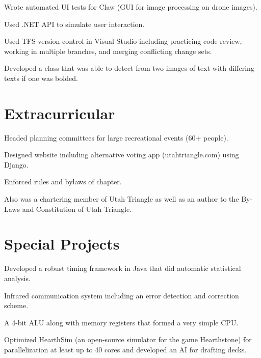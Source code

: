 \documentclass[letterpaper]{deedy-resume} %
\begin{document}
\begin{minipage}[t]{0.64\textwidth}
\begin{tightitemize}
\item Wrote automated UI tests for Claw (GUI for image processing on drone images).
\item Used .NET API to simulate user interaction.
\item Used TFS version control in Visual Studio including practicing code review, working in multiple branches, and merging conflicting change sets.
\item Developed a class that was able to detect from two images of text with differing texts if one was bolded.
\end{tightitemize}

\sectionspace %


\section{Extracurricular}

\begin{tightitemize}
\item Headed planning committees for large recreational events (60+ people).
\item Designed website including alternative voting app (utahtriangle.com) using Django.
\item Enforced rules and bylaws of chapter.
\item Also was a chartering member of Utah Triangle as well as an author to the By-Laws and Constitution of Utah Triangle.
\end{tightitemize}

\sectionspace %


\section{Special Projects} 
\begin{tightitemize}
\item Developed a robust timing framework in Java that did automatic statistical analysis.
\item Infrared communication system including an error detection and correction scheme.
\item A 4-bit ALU along with memory registers that formed a very simple CPU.
\item Optimized HearthSim (an open-source simulator for the game Hearthstone) for parallelization at least up to 40 cores and developed an AI for drafting decks.
\end{tightitemize}


\end{minipage}
\end{document}

